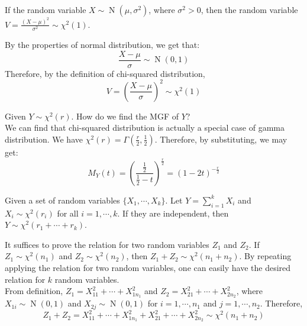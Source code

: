 \documentclass{huhtakm-template-book-v2}
\DeclareMathOperator{\N}{N}
\begin{document}
\begin{thm}
	\label{Chapter 1 (Theorem) chi-square distribution with 1 degree of freedom}
	If the random variable $X\sim\N(\mu,\sigma^{2})$, where $\sigma^{2}>0$, then the random variable $V=\frac{(X-\mu)^{2}}{\sigma^{2}}\sim\chi^{2}(1)$.
\end{thm}
\begin{proofing}
	By the properties of normal distribution, we get that:
	\begin{equation*}
		\frac{X-\mu}{\sigma}\sim\N(0,1)
	\end{equation*}
	Therefore, by the definition of chi-squared distribution,
	\begin{equation*}
		V=\left(\frac{X-\mu}{\sigma}\right)^{2}\sim\chi^{2}(1)
	\end{equation*}
\end{proofing}
\begin{eg}
	Given $Y\sim\chi^{2}(r)$. How do we find the MGF of $Y$?\\
	We can find that chi-squared distribution is actually a special case of gamma distribution. We have $\chi^{2}(r)=\Gamma(\frac{r}{2},\frac{1}{2})$. Therefore, by substituting, we may get:
	\begin{equation*}
		M_{Y}(t)=\left(\frac{\frac{1}{2}}{\frac{1}{2}-t}\right)^{\frac{r}{2}}=(1-2t)^{-\frac{r}{2}}
	\end{equation*}
\end{eg}
\begin{thm}
	Given a set of random variables $\{X_{1},\cdots,X_{k}\}$. Let $Y=\sum_{i=1}^{k}X_{i}$ and $X_{i}\sim\chi^{2}(r_{i})$ for all $i=1,\cdots,k$. If they are independent, then $Y\sim\chi^{2}(r_{1}+\cdots+r_{k})$.
\end{thm}
\begin{proofing}
	It suffices to prove the relation for two random variables $Z_{1}$ and $Z_{2}$. If $Z_{1}\sim\chi^{2}(n_{1})$ and $Z_{2}\sim\chi^{2}(n_{2})$, then $Z_{1}+Z_{2}\sim\chi^{2}(n_{1}+n_{2})$. By repeating applying the relation for two random variables, one can easily have the desired relation for $k$ random variables.\\
	From definition, $Z_{1}=X_{11}^{2}+\cdots+X_{1n_{1}}^{2}$ and $Z_{2}=X_{21}^{2}+\cdots+X_{2n_{2}}^{2}$, where $X_{1i}\sim\N(0,1)$ and $X_{2j}\sim\N(0,1)$ for $i=1,\cdots,n_{1}$ and $j=1,\cdots,n_{2}$. Therefore,
	\begin{equation*}
		Z_{1}+Z_{2}=X_{11}^{2}+\cdots+X_{1n_{1}}^{2}+X_{21}^{2}+\cdots+X_{2n_{2}}^{2}\sim\chi^{2}(n_{1}+n_{2})
	\end{equation*}
\end{proofing}
\end{document}

